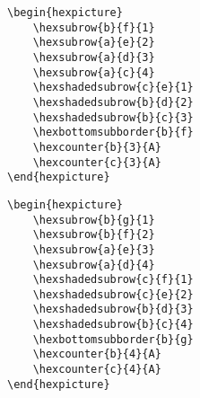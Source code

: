 \documentclass[a4paper,12pt]{article}
\begin{document}
    \begin{hexpicture}
    \end{hexpicture}

    \begin{verbatim}\begin{hexpicture}
    \hexsubrow{b}{f}{1}
    \hexsubrow{a}{e}{2}
    \hexsubrow{a}{d}{3}
    \hexsubrow{a}{c}{4}
    \hexshadedsubrow{c}{e}{1}
    \hexshadedsubrow{b}{d}{2}
    \hexshadedsubrow{b}{c}{3}
    \hexbottomsubborder{b}{f}
    \hexcounter{b}{3}{A}
    \hexcounter{c}{3}{A}
\end{hexpicture}\end{verbatim}

    \begin{hexpicture}
    \end{hexpicture}

    \begin{verbatim}\begin{hexpicture}
    \hexsubrow{b}{g}{1}
    \hexsubrow{b}{f}{2}
    \hexsubrow{a}{e}{3}
    \hexsubrow{a}{d}{4}
    \hexshadedsubrow{c}{f}{1}
    \hexshadedsubrow{c}{e}{2}
    \hexshadedsubrow{b}{d}{3}
    \hexshadedsubrow{b}{c}{4}
    \hexbottomsubborder{b}{g}
    \hexcounter{b}{4}{A}
    \hexcounter{c}{4}{A}
\end{hexpicture}\end{verbatim}

    \begin{hexpicture}
    \end{hexpicture}
\end{document}
